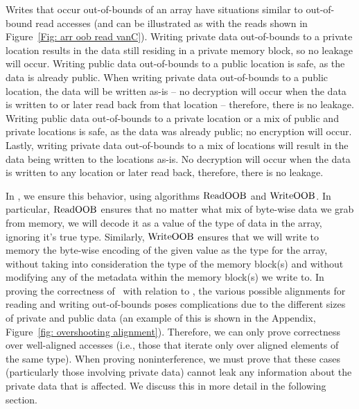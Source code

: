 Writes that occur out-of-bounds of an array have situations similar to out-of-bound read accesses (and can be illustrated as with the reads shown in Figure~\ref{Fig: arr oob read vanC}).
Writing private data out-of-bounds to a private location results in the data still residing in a private memory block, so no leakage will occur. 
Writing public data out-of-bounds to a public location is safe, as the data is already public. 
When writing private data out-of-bounds to a public location, the data will be written as-is -- no decryption will occur when the data is written to or later read back from that location -- therefore, there is no leakage.
Writing public data out-of-bounds to a private location or a mix of public and private locations is safe, as the data was already public; no encryption will occur. 
Lastly, writing private data out-of-bounds to a mix of locations will result in the data being written to the locations as-is. No decryption will occur when the data is written to any location or later read back, therefore, there is no leakage.

In \piccoC, we ensure this behavior, 
using algorithms $\mathrm{ReadOOB}$ and $\mathrm{WriteOOB}$. 
In particular, $\mathrm{ReadOOB}$ ensures that no matter what mix of byte-wise data we grab from memory, we will decode it as a value of the type of data in the array, ignoring it's true type. 
Similarly, $\mathrm{WriteOOB}$ ensures that we will write to memory the byte-wise encoding of the given value as the type for the array, without taking into consideration the type of the memory block(s) and without modifying any of the metadata within the memory block(s) we write to. 
In proving the correctness of \piccoC\ with relation to \vanillaC, the various possible alignments for reading and writing out-of-bounds poses complications due to the different sizes of private and public data (an example of this is shown in the Appendix, Figure~\ref{fig: overshooting alignment}). Therefore, we can only prove correctness over well-aligned accesses (i.e., those that iterate only over aligned elements of the same type). 
When proving noninterference, we must prove that these cases (particularly those involving private data) cannot leak any information about the private data that is affected. We discuss this in more detail in
the following section.















